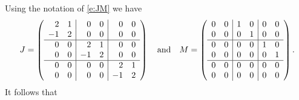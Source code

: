 \documentclass{ximera}
\begin{document}
Using the notation of \eqref{e:JM} we have
\[
J = \left(\begin{array}{rr|rr|rr} 
 2 & 1 & 0 & 0 & 0 & 0\\
-1 & 2 & 0 & 0 & 0 & 0 \\  
 \hline
 0 & 0 & 2 & 1 & 0 & 0 \\
 0 & 0 &-1 & 2 & 0 & 0 \\
\hline
 0 & 0 & 0 & 0 & 2 & 1\\
 0 & 0 & 0 & 0 &-1 & 2  \end{array}\right) 
\quad\mbox{and}\quad 
M = \left(\begin{array}{rr|rr|rr} 
 0 & 0 & 1 & 0 & 0 & 0\\
0 & 0 & 0 & 1 & 0 & 0 \\  
 \hline
 0 & 0 & 0 & 0 & 1 & 0 \\
 0 & 0 & 0 & 0 & 0 & 1 \\
\hline
 0 & 0 & 0 & 0 & 0 & 0\\
 0 & 0 & 0 & 0 & 0 & 0  \end{array}\right).
\]
It follows that 
\end{document}
